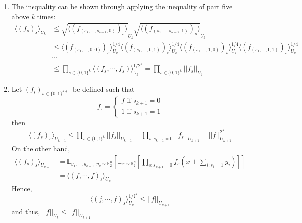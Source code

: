 \documentclass[12pt]{article}%
\newcommand{\Fn}{\mathbb{F}_2^n}
\newcommand{\Exp}[1]{\mathbb{E}_{#1}}
\begin{document}
\begin{enumerate}
  \item
  The inequality can be shown through applying the inequality of part five above $k$ times:
  \begin{align*}
    \langle (f_s)_s \rangle_{U_k} & \leq \sqrt{ \langle(f_{(s_1,\cdots, s_{k-1}, 0)})_s\rangle}_{U_k}\sqrt{ \langle(f_{(s_1,\cdots, s_{k-1}, 1)})_s\rangle}_{U_k} \\
      & \leq \langle(f_{(s_1,\cdots, 0, 0)})_s\rangle_{U_k}^{1/4} \langle(f_{(s_1,\cdots, 0, 1)})_s\rangle_{U_k}^{1/4} \langle(f_{(s_1,\cdots, 1, 0)})_s\rangle_{U_k}^{1/4} \langle(f_{(s_1,\cdots, 1, 1)})_s\rangle_{U_k}^{1/4} \\
      & \cdots \\
      & \leq \prod_{s \in \{0,1\}^k} \langle (f_s, \cdots, f_s) \rangle_{U_k}^{1/2^k} = \prod_{s \in \{0,1\}^k} ||f_s||_{U_k}
  \end{align*}

  \item
  Let $(f_s)_{s \in \{0,1\}^{k+1}}$ be defined such that
  \begin{equation*}
      f_s = \begin{cases}
              f \text{ if } s_{k+1} = 0 \\
              1 \text{ if } s_{k+1} = 1
            \end{cases}
  \end{equation*}
  then
  \begin{align*}
    \langle (f_s)_s \rangle_{U_{k+1}} \leq  \prod_{s \in \{0,1\}^k} ||f_s||_{U_{k+1}} = \prod_{s: s_{k+1} = 0} ||f_s||_{U_{k+1}} = ||f||_{U_{k+1}}^{2^k}
  \end{align*}
  On the other hand,
  \begin{align*}
        \langle (f_s)_s \rangle_{U_{k+1}} & = \Exp{y_1, \cdots, y_{k-1}, y_k \sim \Fn} \left[ \Exp{x \sim \Fn} \left[ \prod_{s: s_{k+1} = 0} f_s(x + \sum_{i: s_i = 1} y_i) \right] \right] \\
        & = \langle (f, \cdots, f)_s \rangle_{U_k}
  \end{align*}
  Hence,
  $$ \langle (f, \cdots, f)_s \rangle_{U_k}^{1/2^k} \leq  ||f||_{U_{k+1}}$$
  and thus, $||f||_{U_{k}}\leq ||f||_{U_{k+1}}$


\end{enumerate}
\end{document}
